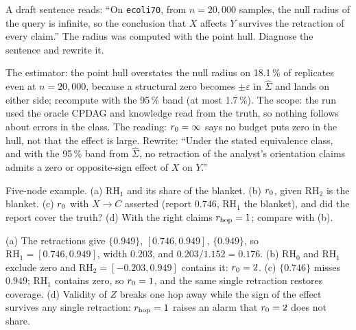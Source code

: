 \begin{exercicio}[metodo=diagnosis,conceito=banda-plugin]
A draft sentence reads: ``On \texttt{ecoli70}, from $n = 20{,}000$ samples, the null radius of the query is infinite, so the
conclusion that $X$ affects $Y$ survives the retraction of every claim.'' The radius was computed with the point hull.
Diagnose the sentence and rewrite it.
\end{exercicio}
\begin{solucao}
The estimator: the point hull overstates the null radius on 18.1\,\% of replicates even at $n = 20{,}000$, because a
structural zero becomes $\pm\varepsilon$ in $\widehat\Sigma$ and lands on either side; recompute with the 95\,\% band (at most
1.7\,\%). The scope: the run used the oracle CPDAG and knowledge read from the truth, so nothing follows about errors in the class.
The reading: $r_{0} = \infty$ says no budget puts zero in the hull, not that the effect is large. Rewrite: ``Under the stated equivalence class, and with the 95\,\% band from
$\widehat\Sigma$, no retraction of the analyst's orientation claims admits a zero or opposite-sign effect of $X$ on $Y$.''
\end{solucao}

\begin{exercicio}[metodo=calculation,conceito=nulidade]
Five-node example. (a) $\mathrm{RH}_1$ and its share of the blanket. (b) $r_{0}$, given $\mathrm{RH}_2$ is the blanket. (c)
$r_{0}$ with $X\to C$ asserted (report $0.746$, $\mathrm{RH}_1$ the blanket), and did the report cover the truth? (d) With the right
claims $r_{\mathrm{hop}} = 1$; compare with (b).
\end{exercicio}
\begin{solucao}
(a) The retractions give $\{0.949\}$, $[0.746, 0.949]$, $\{0.949\}$, so $\mathrm{RH}_1 = [0.746, 0.949]$, width $0.203$, and
$0.203/1.152 = 0.176$. (b) $\mathrm{RH}_0$ and $\mathrm{RH}_1$ exclude zero and $\mathrm{RH}_2 = [-0.203, 0.949]$ contains it:
$r_{0} = 2$. (c) $\{0.746\}$ misses $0.949$; $\mathrm{RH}_1$ contains zero, so $r_{0} = 1$, and the same single retraction
restores coverage. (d) Validity of $Z$ breaks one hop away while the sign of the effect survives any single retraction: $r_{\mathrm{hop}}
= 1$ raises an alarm that $r_{0} = 2$ does not share.
\end{solucao}

